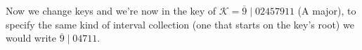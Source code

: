 \documentclass[preview]{standalone}
\begin{document}
\begin{center}
Now we change keys and we're now in the key of $ \mathcal{K} =  \overline{9} \mid 0 2 4 5 7 9 11$ (A major), to specify the same kind of interval collection (one that starts on the key's root) we would write $ \overline{9} \mid 0 4 7 11$.
\end{center}
\end{document}
